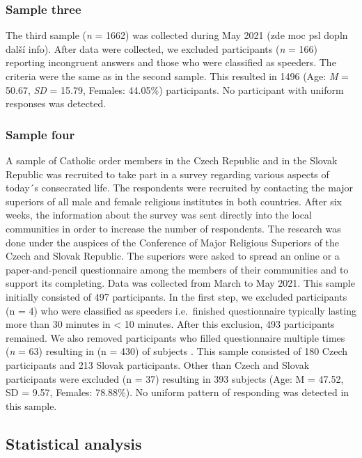 \documentclass[ijerph,article,accept,moreauthors,pdftex]{mdpi}
\begin{document}
\hypertarget{sample-three}{%
\subsubsection{Sample three}\label{sample-three}}

The third sample (\emph{n} = 1662) was collected during May 2021 (zde
moc psl dopln další info). After data were collected, we excluded
participants (\emph{n} = 166) reporting incongruent answers and those
who were classified as speeders. The criteria were the same as in the
second sample. This resulted in 1496 (Age: \emph{M} = 50.67, \emph{SD} =
15.79, Females: 44.05\%) participants. No participant with uniform
responses was detected.

\hypertarget{sample-four}{%
\subsubsection{Sample four}\label{sample-four}}

A sample of Catholic order members in the Czech Republic and in the
Slovak Republic was recruited to take part in a survey regarding various
aspects of today´s consecrated life. The respondents were recruited by
contacting the major superiors of all male and female religious
institutes in both countries. After six weeks, the information about the
survey was sent directly into the local communities in order to increase
the number of respondents. The research was done under the auspices of
the Conference of Major Religious Superiors of the Czech and Slovak
Republic. The superiors were asked to spread an online or a
paper-and-pencil questionnaire among the members of their communities
and to support its completing. Data was collected from March to May
2021. This sample initially consisted of 497 participants. In the first
step, we excluded participants (n = 4) who were classified as speeders
i.e.~finished questionnaire typically lasting more than 30 minutes in
\textless{} 10 minutes. After this exclusion, 493 participants remained.
We also removed participants who filled questionnaire multiple times
(\emph{n} = 63) resulting in (n = 430) of subjects . This sample
consisted of 180 Czech participants and 213 Slovak participants. Other
than Czech and Slovak participants were excluded (n = 37) resulting in
393 subjects (Age: M = 47.52, SD = 9.57, Females: 78.88\%). No uniform
pattern of responding was detected in this sample.

\hypertarget{statistical-analysis}{%
\subsection{Statistical analysis}\label{statistical-analysis}}
\end{document}
